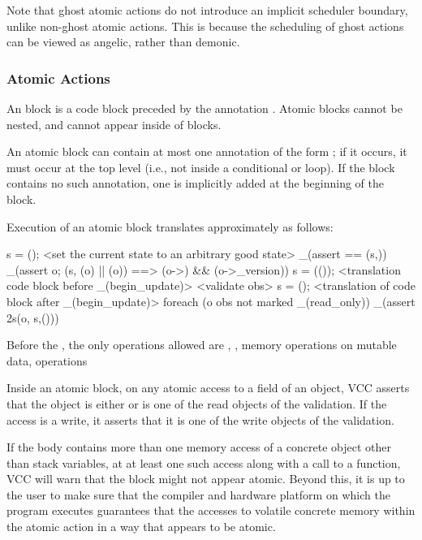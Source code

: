 \documentclass[preprint,nocopyrightspace]{sigplanconf}
\begin{document}
{{{Note that ghost atomic actions do not introduce an implicit scheduler
boundary, unlike non-ghost atomic actions. This is because the
scheduling of ghost actions can be viewed as angelic, rather than
demonic.

\subsubsection{Atomic Actions}

An  block is a code block preceded by the
annotation . Atomic blocks cannot be nested, and
cannot appear inside of  blocks. 

An atomic block can contain at most one annotation of the
form ; if it occurs, it must occur at the top
level (i.e., not inside a conditional or loop). If the block contains
no such annotation, one is implicitly added at the beginning of the
block. 

Execution of an atomic block translates approximately as follows:
\begin{VCC}
\state s = \now();
<set the current state to an arbitrary good state>
_(assert \me == \at(s,\me))
_(assert \forall \object o; \at(s, \wrapped(o) || \mutable(o))
    ==> \unchanged(o->\version) && \unchanged(o->\volatile_version))
s = \stutter(\now());
<translation code block before _(begin_update)>
<validate obs>
s = \now();
<translation of code block after _(begin_update)>
foreach (\object o \in obs not marked _(read_only))
  _(assert \inv2s(o, s,\now()))
\end{VCC}

Before the , the only operations allowed
are , , memory operations on mutable data,
 operations 

Inside an atomic block, on any atomic access to a field of an object,
VCC asserts that the object is either \vcc{\mutable} or is one of the
read objects of the validation. If the access is a write, it asserts
that it is one of the write objects of the validation.

If the body contains more than one memory access of a concrete object
other than stack variables, at at least one such access along with a
call to a  function, VCC will warn that the block might
not appear atomic. Beyond this, it is up to the user to make sure that the
compiler and hardware platform on which the program executes guarantees that 
the accesses to volatile concrete memory within the
atomic action in a way that appears to be atomic. 

}}}
\end{document}
